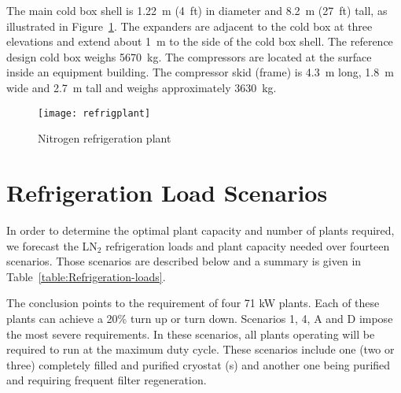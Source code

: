The main cold box shell is 1.22~m (4~ft) in diameter and 8.2~m (27~ft) tall, 
as illustrated in Figure~\ref{fig:nitrogren-refrigerator}. The expanders 
are adjacent to the cold box at three elevations and extend about 1~m to
the side of the cold box shell. The reference design cold box weighs 5670~kg. The 
compressors are located at the surface inside an equipment building. 
The compressor skid (frame) is 4.3~m long, 1.8~m wide and 2.7~m tall 
and weighs approximately 3630~kg.  

\begin{figure}[htbp]
\centering
\texttt{[image: refrigplant]}
\caption{Nitrogen refrigeration plant}
\label{fig:nitrogren-refrigerator}
\end{figure}

\section{Refrigeration Load Scenarios}
\label{sec:refrigeration-load-scenarios}


In order to determine the optimal plant capacity and number of plants 
required, we forecast the LN$_2$ refrigeration loads and plant capacity
needed over fourteen scenarios.  Those scenarios are described below and 
a summary is given in Table~\ref{table:Refrigeration-loads}. 
                          
The conclusion points to the requirement of four 71 kW plants. Each of 
these plants can achieve a 20\% turn up or turn down. Scenarios 1, 4, A and D 
impose the most severe requirements. In these scenarios, all plants operating 
will be required to run at the maximum duty cycle. These 
scenarios include one (two or three) completely filled and purified 
cryostat (s) and another one being purified and requiring frequent 
filter regeneration.

